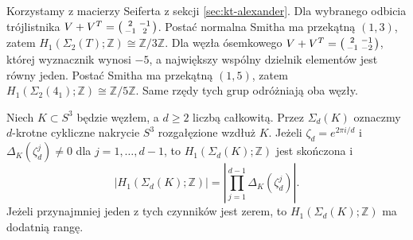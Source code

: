 \begin{przyklad}
Korzystamy z macierzy Seiferta z sekcji
\ref{sec:kt-alexander}. Dla wybranego odbicia trójlistnika
$V+V^T=\begin{psmallmatrix}2&-1\\-1&2\end{psmallmatrix}$.
Postać normalna Smitha ma przekątną $(1,3)$,
zatem $H_1(\Sigma_2(T);\mathbb Z)\cong\mathbb Z/3\mathbb Z$.
Dla węzła ósemkowego
$V+V^T=\begin{psmallmatrix}2&-1\\-1&-2\end{psmallmatrix}$,
której wyznacznik wynosi $-5$, a największy wspólny
dzielnik elementów jest równy jeden.
Postać Smitha ma przekątną $(1,5)$, zatem
$H_1(\Sigma_2(4_1);\mathbb Z)\cong\mathbb Z/5\mathbb Z$.
Same rzędy tych grup odróżniają oba węzły.
\end{przyklad}

\begin{twierdzenie}
Niech $K\subset S^3$ będzie węzłem, a $d\ge2$ liczbą
całkowitą. Przez $\Sigma_d(K)$ oznaczmy $d$-krotne
cykliczne nakrycie $S^3$ rozgałęzione wzdłuż $K$.
Jeżeli $\zeta_d=e^{2\pi i/d}$ i
$\Delta_K(\zeta_d^j)\ne0$ dla $j=1,\dots,d-1$, to
$H_1(\Sigma_d(K);\mathbb Z)$ jest skończona i
\[
|H_1(\Sigma_d(K);\mathbb Z)|=
\left|\prod_{j=1}^{d-1}\Delta_K(\zeta_d^j)\right|.
\]
Jeżeli przynajmniej jeden z tych czynników jest zerem,
to $H_1(\Sigma_d(K);\mathbb Z)$ ma dodatnią rangę.
\end{twierdzenie}

